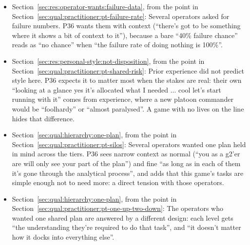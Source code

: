 \begin{itemize}[leftmargin=1.2em,itemsep=1pt]
\item Section~\ref{sec:res:operator-wants:failure-data}, from the point in Section~\ref{sec:qual:practitioner:pt-failure-rate}: Several operators asked for failure numbers. P36 wants them with context (``there's got to be something where it shows a bit of context to it''), because a bare ``40\% failure chance'' reads as ``no chance'' when ``the failure rate of doing nothing is 100\%''.
\item Section~\ref{sec:res:personal-style:not-disposition}, from the point in Section~\ref{sec:qual:practitioner:pt-shared-risk}: Prior experience did not predict style here. P36 expects it to matter most when the stakes are real: their own ``looking at a glance yes it's allocated what I needed ... cool let's start running with it'' comes from experience, where a new platoon commander would be ``foolhardy'' or ``almost paralysed''. A game with no lives on the line hides that difference.
\item Section~\ref{sec:qual:hierarchy:one-plan}, from the point in Section~\ref{sec:qual:practitioner:pt-silos}: Several operators wanted one plan held in mind across the tiers. P36 sees narrow context as normal (``you as a g2'er are will only see your part of the plan'') and fine ``as long as in each of them it's gone through the analytical process'', and adds that this game's tasks are simple enough not to need more: a direct tension with those operators.
\item Section~\ref{sec:qual:hierarchy:one-plan}, from the point in Section~\ref{sec:qual:practitioner:pt-one-up-two-down}: The operators who wanted one shared plan are answered by a different design: each level gets ``the understanding they're required to do that task'', and ``it doesn't matter how it docks into everything else''.
\end{itemize}
